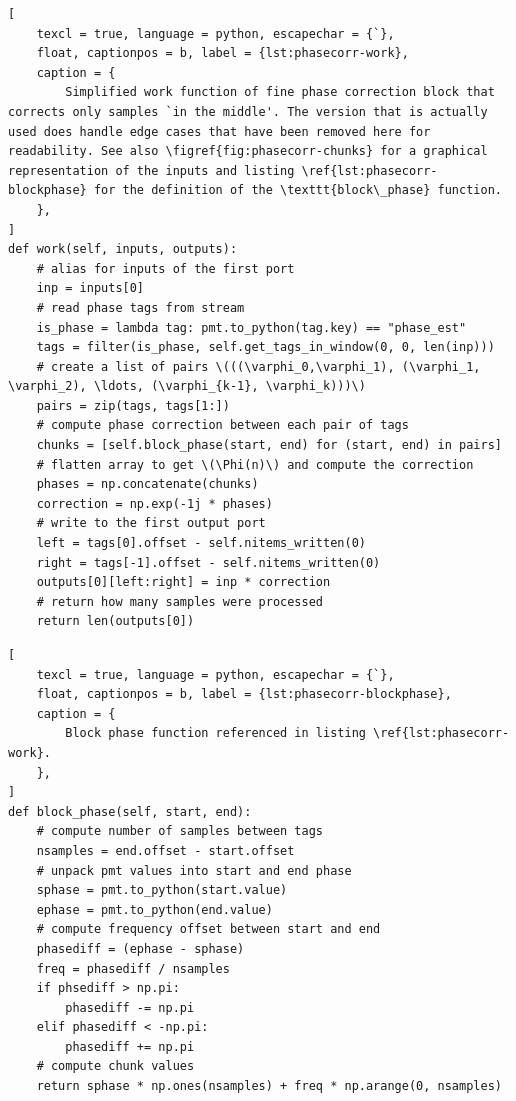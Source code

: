 \begin{lstlisting}[
	texcl = true, language = python, escapechar = {`},
	float, captionpos = b, label = {lst:phasecorr-work},
	caption = {
		Simplified work function of fine phase correction block that corrects only samples `in the middle'. The version that is actually used does handle edge cases that have been removed here for readability. See also \figref{fig:phasecorr-chunks} for a graphical representation of the inputs and listing \ref{lst:phasecorr-blockphase} for the definition of the \texttt{block\_phase} function.
	},
]
def work(self, inputs, outputs):
	# alias for inputs of the first port
	inp = inputs[0]
	# read phase tags from stream
	is_phase = lambda tag: pmt.to_python(tag.key) == "phase_est"
	tags = filter(is_phase, self.get_tags_in_window(0, 0, len(inp)))
	# create a list of pairs \(((\varphi_0,\varphi_1), (\varphi_1, \varphi_2), \ldots, (\varphi_{k-1}, \varphi_k)))\)
	pairs = zip(tags, tags[1:])
	# compute phase correction between each pair of tags
	chunks = [self.block_phase(start, end) for (start, end) in pairs]
	# flatten array to get \(\Phi(n)\) and compute the correction
	phases = np.concatenate(chunks)
	correction = np.exp(-1j * phases) 
	# write to the first output port
	left = tags[0].offset - self.nitems_written(0)
	right = tags[-1].offset - self.nitems_written(0)
	outputs[0][left:right] = inp * correction
	# return how many samples were processed
	return len(outputs[0])
\end{lstlisting}

\begin{lstlisting}[
	texcl = true, language = python, escapechar = {`},
	float, captionpos = b, label = {lst:phasecorr-blockphase},
	caption = {
		Block phase function referenced in listing \ref{lst:phasecorr-work}.
	},
]
def block_phase(self, start, end):
	# compute number of samples between tags
	nsamples = end.offset - start.offset
	# unpack pmt values into start and end phase
	sphase = pmt.to_python(start.value)
	ephase = pmt.to_python(end.value)
	# compute frequency offset between start and end
	phasediff = (ephase - sphase)
	freq = phasediff / nsamples
	if phsediff > np.pi:
		phasediff -= np.pi
	elif phasediff < -np.pi:
		phasediff += np.pi
	# compute chunk values
	return sphase * np.ones(nsamples) + freq * np.arange(0, nsamples)
\end{lstlisting}

